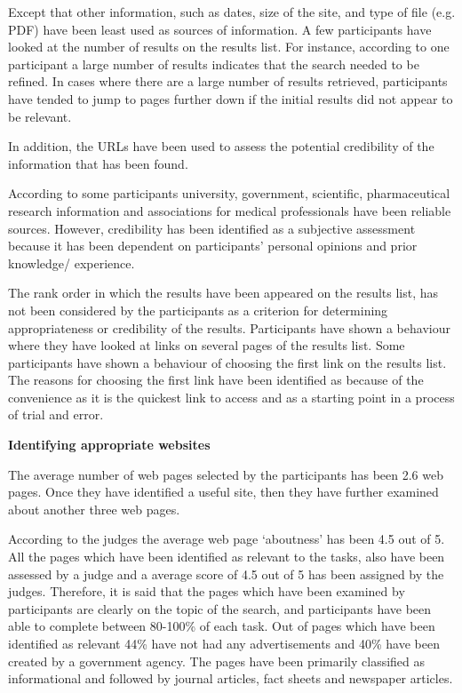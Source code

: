 \documentclass[]{article}
\begin{document}
Except that other information, such as dates, size of the site, and type of file (e.g. PDF) have been least used as sources of information. A few participants have looked at the number of results on the results list. For instance, according to one participant a large number of results indicates that the search needed to be refined. In cases where there are a large number of results retrieved, participants have tended to jump to pages further down if the initial results did not appear to be relevant.
   
In addition, the URLs have been used to  assess the potential credibility of the information that has been found.

According to some participants  university, government, scientific, pharmaceutical research information and associations for medical professionals have been reliable sources. However, credibility has been identified as a subjective assessment because it has been dependent on participants' personal opinions and prior knowledge/ experience.

The rank order in which the results have been appeared on the results list, has not been considered by the participants as a criterion for determining appropriateness or credibility of the results. Participants have shown a behaviour where they have looked at links on several pages of the results list. Some participants have shown a behaviour of choosing the first link on the results list. The reasons for choosing the first link have been identified as because of the convenience as it is the quickest link to access and as a starting point in a process of trial and error.  

\textbf{Identifying appropriate websites} 

The average number of web
pages selected by the participants has been 2.6 web pages. Once they have identified a useful site, then they have further examined about another three web pages. 

According to the judges the average web page ‘aboutness’ has been 4.5 out of 5. All the pages which have been identified as relevant to the tasks, also have been assessed by a judge and a average score of 4.5 out of 5 has been assigned by the judges. Therefore, it is said that the pages which have been examined by participants are clearly on the topic of the search, and participants have been able to complete between 80-100\% of each task. Out of pages which have been identified as relevant 44\% have not had any advertisements and 40\% have been created by a government agency. The pages have been primarily classified as informational and followed by journal articles, fact sheets and newspaper articles. 
\end{document}

